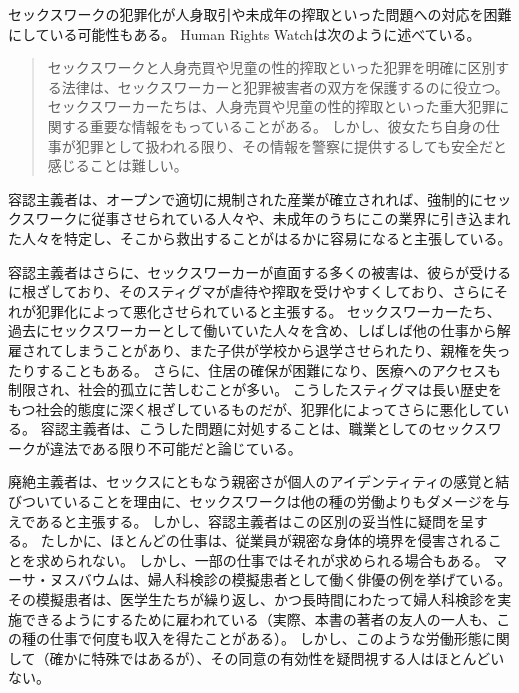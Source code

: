 \documentclass[paper=a4,book,openany]{jlreq}
\begin{document}
セックスワークの犯罪化が人身取引や未成年の搾取といった問題への対応を困難にしている可能性もある。
Human Rights Watchは次のように述べている。

\begin{quote}
セックスワークと人身売買や児童の性的搾取といった犯罪を明確に区別する法律は、セックスワーカーと犯罪被害者の双方を保護するのに役立つ。
セックスワーカーたちは、人身売買や児童の性的搾取といった重大犯罪に関する重要な情報をもっていることがある。
しかし、彼女たち自身の仕事が犯罪として扱われる限り、その情報を警察に提供するしても安全だと感じることは難しい。
\citep{watch19:_why_sex_work_shoul_be_decrim}
\end{quote}

容認主義者は、オープンで適切に規制された産業が確立されれば、強制的にセックスワークに従事させられている人々や、未成年のうちにこの業界に引き込まれた人々を特定し、そこから救出することがはるかに容易になると主張している\citep{albright17:_decreas_human_traff_sex_work_decrim}。

容認主義者はさらに、セックスワーカーが直面する多くの被害は、彼らが受けるに根ざしており、そのスティグマが虐待や搾取を受けやすくしており、さらにそれが犯罪化によって悪化させられていると主張する。
セックスワーカーたち、過去にセックスワーカーとして働いていた人々を含め、しばしば他の仕事から解雇されてしまうことがあり、また子供が学校から退学させられたり、親権を失ったりすることもある。
さらに、住居の確保が困難になり、医療へのアクセスも制限され、社会的孤立に苦しむことが多い\citep{stardust17:_stigm_sex_work_comes_high_cost}。
こうしたスティグマは長い歴史をもつ社会的態度に深く根ざしているものだが、犯罪化によってさらに悪化している。
容認主義者は、こうした問題に対処することは、職業としてのセックスワークが違法である限り不可能だと論じている。

廃絶主義者は、セックスにともなう親密さが個人のアイデンティティの感覚と結びついていることを理由に、セックスワークは他の種の労働よりもダメージを与えであると主張する。
しかし、容認主義者はこの区別の妥当性に疑問を呈する。
たしかに、ほとんどの仕事は、従業員が親密な身体的境界を侵害されることを求められない。
しかし、一部の仕事ではそれが求められる場合もある。
マーサ・ヌスバウムは、婦人科検診の模擬患者として働く俳優の例を挙げている\citep{nussbaum98:_wheth_reason_prejud}。
その模擬患者は、医学生たちが繰り返し、かつ長時間にわたって婦人科検診を実施できるようにするために雇われている（実際、本書の著者の友人の一人も、この種の仕事で何度も収入を得たことがある）。
しかし、このような労働形態に関して（確かに特殊ではあるが）、その同意の有効性を疑問視する人はほとんどいない。
\end{document}
